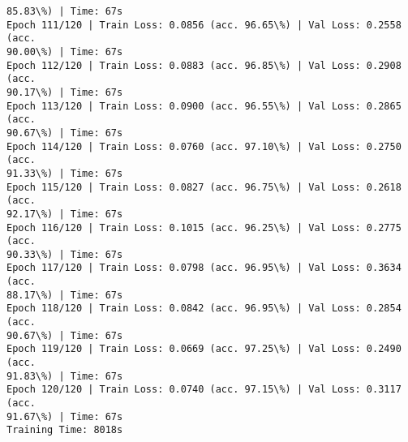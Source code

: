 \documentclass[8pt]{extarticle}
\begin{document}
\begin{Verbatim}[commandchars=\\\{\}]
85.83\%) | Time: 67s
Epoch 111/120 | Train Loss: 0.0856 (acc. 96.65\%) | Val Loss: 0.2558 (acc.
90.00\%) | Time: 67s
Epoch 112/120 | Train Loss: 0.0883 (acc. 96.85\%) | Val Loss: 0.2908 (acc.
90.17\%) | Time: 67s
Epoch 113/120 | Train Loss: 0.0900 (acc. 96.55\%) | Val Loss: 0.2865 (acc.
90.67\%) | Time: 67s
Epoch 114/120 | Train Loss: 0.0760 (acc. 97.10\%) | Val Loss: 0.2750 (acc.
91.33\%) | Time: 67s
Epoch 115/120 | Train Loss: 0.0827 (acc. 96.75\%) | Val Loss: 0.2618 (acc.
92.17\%) | Time: 67s
Epoch 116/120 | Train Loss: 0.1015 (acc. 96.25\%) | Val Loss: 0.2775 (acc.
90.33\%) | Time: 67s
Epoch 117/120 | Train Loss: 0.0798 (acc. 96.95\%) | Val Loss: 0.3634 (acc.
88.17\%) | Time: 67s
Epoch 118/120 | Train Loss: 0.0842 (acc. 96.95\%) | Val Loss: 0.2854 (acc.
90.67\%) | Time: 67s
Epoch 119/120 | Train Loss: 0.0669 (acc. 97.25\%) | Val Loss: 0.2490 (acc.
91.83\%) | Time: 67s
Epoch 120/120 | Train Loss: 0.0740 (acc. 97.15\%) | Val Loss: 0.3117 (acc.
91.67\%) | Time: 67s
Training Time: 8018s


\end{Verbatim}
\end{document}
